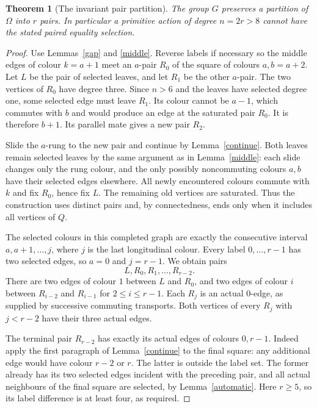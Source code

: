 \documentclass[11pt,a4paper]{article}
\newtheorem{theorem}{Theorem}
\begin{document}
\begin{theorem}[The invariant pair partition]\label{pairs}
The group $G$ preserves a partition of $\Omega$ into $r$
pairs. In particular a primitive action of degree $n=2r>8$
cannot have the stated paired equality selection.
\end{theorem}
\begin{proof}
Use Lemmas~\ref{gap} and \ref{middle}. Reverse labels if
necessary so the middle edges of colour $k=a+1$ meet an
$a$-pair $R_0$ of the square of colours $a,b=a+2$.
Let $L$ be the pair of selected leaves, and let $R_1$ be
the other $a$-pair. The two vertices of $R_0$ have degree
three. Since $n>6$ and the leaves have selected degree one,
some selected edge must leave $R_1$. Its colour cannot
be $a-1$, which commutes with $b$ and would produce an
edge at the saturated pair $R_0$. It is therefore $b+1$.
Its parallel mate gives a new pair $R_2$.

Slide the $a$-rung to the new pair and continue by
Lemma~\ref{continue}. Both leaves remain selected leaves
by the same argument as in Lemma~\ref{middle}: each slide
changes only the rung colour, and the only possibly
noncommuting colours $a,b$ have their selected edges
elsewhere. All newly encountered colours commute with
$k$ and fix $R_0$, hence fix $L$. The remaining old
vertices are saturated. Thus the construction uses distinct
pairs and, by connectedness, ends only when it includes
all vertices of $Q$.

The selected colours in this completed graph are exactly
the consecutive interval $a,a+1,\ldots,j$, where $j$
is the last longitudinal colour. Every label
$0,\ldots,r-1$ has two selected edges, so $a=0$ and
$j=r-1$. We obtain pairs
\[
                        L,R_0,R_1,\ldots,R_{r-2}.
\]
There are two edges of colour $1$ between $L$ and $R_0$,
and two edges of colour $i$ between $R_{i-2}$ and
$R_{i-1}$ for $2\le i\le r-1$. Each $R_j$ is an
actual $0$-edge, as supplied by successive commuting
transports. Both vertices of every $R_j$ with $j<r-2$
have their three actual edges.

The terminal pair $R_{r-2}$ has exactly its actual edges
of colours $0,r-1$. Indeed apply the first paragraph of
Lemma~\ref{continue} to the final square: any additional
edge would have colour $r-2$ or $r$. The latter is outside
the label set. The former already has its two selected
edges incident with the preceding pair, and all actual
neighbours of the final square are selected, by
Lemma~\ref{automatic}. Here $r\ge5$, so its label
difference is at least four, as required.


\end{proof}
\end{document}
